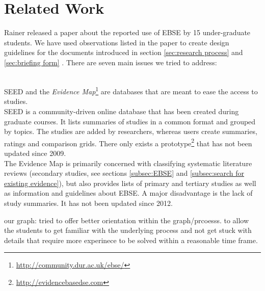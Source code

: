 
\section{Related Work}
\label{sec:related work}

Rainer \etal \cite{Rainer2006} released a paper about the reported use of EBSE by 15 under-graduate students. 
We have used observations listed in the paper to create design guidelines for the documents introduced in section \ref{sec:research process} and \ref{sec:briefing form} . There are seven main issues we tried to address:


\\

SEED and the \emph{Evidence Map}\footnote{\url{http://community.dur.ac.uk/ebse/}}  are databases that are meant to ease the access to studies.\\ 
SEED is a community-driven online database that has been created during graduate courses. It lists summaries of studies in a common format and grouped by topics. The studies are added by researchers, whereas users create summaries, ratings and comparison grids. There only exists a prototype\footnote{\url{http://evidencebasedse.com}} that has not been updated since 2009.\\
The Evidence Map is primarily concerned with  classifying systematic literature reviews (secondary studies, see sections \ref{subsec:EBSE} and \ref{subsec:search for existing evidence}), but also provides lists of primary and tertiary studies as well as information and guidelines about EBSE. A major disadvantage is the lack of study summaries. It has not been updated since 2012.

 \cite{Rainer2008}
our graph: tried to offer better orientation within the graph/prcoesss. to allow the students to get familiar with the underlying process and not get stuck with details that require more experinece to be solved within a reasonable time frame.